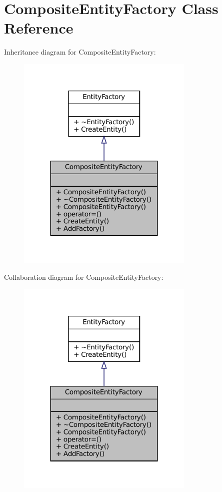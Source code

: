 \hypertarget{classCompositeEntityFactory}{}\section{Composite\+Entity\+Factory Class Reference}
\label{classCompositeEntityFactory}


Inheritance diagram for Composite\+Entity\+Factory\+:\nopagebreak
\begin{figure}[H]
\begin{center}
\leavevmode
\includegraphics[width=240pt]{classCompositeEntityFactory__inherit__graph}
\end{center}
\end{figure}


Collaboration diagram for Composite\+Entity\+Factory\+:\nopagebreak
\begin{figure}[H]
\begin{center}
\leavevmode
\includegraphics[width=240pt]{classCompositeEntityFactory__coll__graph}
\end{center}
\end{figure}
